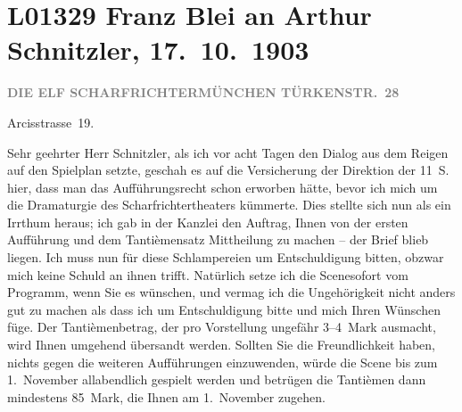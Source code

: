 

\section[Franz Blei an Arthur Schnitzler, 17. 10. 1903]{L01329 Franz Blei an Arthur Schnitzler, 17. 10. 1903}
\nopagebreak{}
\rehead{ }\normalsize\beginnumbering{}
\toendnotes[C]{\smallbreak\pagebreak[2]}
\toendnotes[C]{\smallbreak}
\pstart
           \centering{}{\pb}\textcolor{gray}{\textbf{DIE ELF SCHARFRICHTERMÜNCHEN TÜRKENSTR. 28}}\pend
           
\pstart
           \raggedleft{}Arcisstrasse 19. \pend
           
\pstart{}Sehr geehrter Herr Schnitzler,\pend\vspace{0.5em}
\pstart
           als ich vor acht Tagen den Dialog aus dem Reigen
               auf den Spielplan setzte, geschah es auf die Versicherung der Direktion der 11 S. hier, dass man das Aufführungsrecht schon
               erworben hätte, bevor ich mich um die Dramaturgie des Scharfrichtertheaters kümmerte. Dies stellte sich nun als ein Irrthum
               heraus; ich gab in der Kanzlei den Auftrag, Ihnen von der ersten Aufführung und dem
               Tantièmensatz Mittheilung zu machen – der Brief blieb liegen. Ich muss nun für diese
               Schlampereien um Entschuldigung bitten, obzwar mich keine Schuld an ihnen trifft.
               Natürlich setze ich die Scenesofort vom Programm, wenn Sie es wünschen, und
               vermag ich die Ungehörigkeit {\pb}nicht anders gut zu machen als
               dass ich um Entschuldigung bitte und mich Ihren Wünschen füge. Der Tantièmenbetrag,
               der pro Vorstellung ungefähr 3–4 Mark ausmacht, wird Ihnen umgehend übersandt werden.
               Sollten Sie die Freundlichkeit \introOben{}haben\introOben{}, nichts gegen die
               weiteren Aufführungen einzuwenden, würde die Scene bis zum 1. November allabendlich
               gespielt werden und betrügen die Tantièmen dann mindestens 85 Mark, die Ihnen am
                  1. November zugehen.\pend
           
